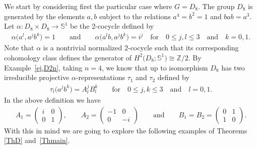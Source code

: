 \documentclass[pdftex]{sigma}
\def\Z{\mathbb{Z}}
\def\S{\mathbb{S}}
\theoremstyle{definition}
\numberwithin{equation}{section}
\begin{document}

We start by considering first the particular case where $G=D_{8}$. The group $D_{8}$
is generated by the elements $a,b$ subject to the relations $a^{4}=b^{2}=1$ and $bab=a^{3}$.
Let $\alpha\colon D_{8}\times D_{8}\rightarrow \S^{1}$ be the 2-cocycle defined by
\begin{gather*}
\alpha\big(a^{l},a^{j}b^{k}\big)=1\qquad \text{and}\qquad
\alpha\big(a^{l}b,a^{j}b^{k}\big)=i^{j}
\quad \text{for} \quad 0\leq j,l\leq 3 \quad \text{and}\quad k=0,1.
\end{gather*}
Note that $\alpha$ is a nontrivial normalized 2-cocycle such that its corresponding
cohomology class defines the generator of $H^{2}\big(D_{8};\S^{1}\big)\cong \Z/2$.
By Example~\ref{ej,D2n}, taking $n=4$, we know that up to isomorphism $D_{8}$ has two
irreducible projective $\alpha$-representations
$\tau_{1}$ and $\tau_{2}$ defined by
\begin{gather*}
\tau_{l}\big(a^{j}b^{k}\big)=A_{l}^{j}B_{l}^{k} \qquad \text{for} \quad 0\leq j,k\leq 3
\quad \text{and} \quad l=0,1.
\end{gather*}
In the above definition we have
\begin{gather*}
A_{1}=
\begin{pmatrix}
i & 0\\
0 & 1
\end{pmatrix},\qquad
A_{2}=
\begin{pmatrix}
-1 & 0\\
0 & -i
\end{pmatrix}
\qquad \text{and}\qquad
B_{1}=B_{2}=
\begin{pmatrix}
0 & 1\\
1 & 0
\end{pmatrix}\!.
\end{gather*}
With this in mind we are going to explore the following examples of Theorems
\ref{ThD} and~\ref{Thmain}.
\end{document}

